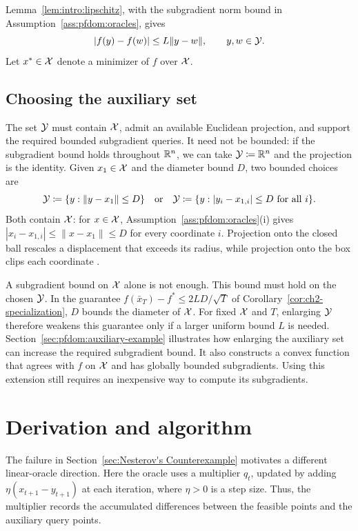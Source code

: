 Lemma~\ref{lem:intro:lipschitz}, with the subgradient norm bound
in Assumption~\ref{ass:pfdom:oracles}, gives
\begin{equation}\label{eq:pfdom:lipschitz}
    |f(y)-f(w)|\leq L\|y-w\|,\qquad y,w\in\mathcal{Y}.
\end{equation}
Let $x^*\in\mathcal{X}$ denote a minimizer of $f$ over $\mathcal{X}$.

\subsection{Choosing the auxiliary set}
\label{sec:pfdom:auxiliary-choice}

The set $\mathcal{Y}$ must contain $\mathcal{X}$, admit an available Euclidean projection,
and support the required bounded subgradient queries. It need not be bounded:
if the subgradient bound holds throughout $\mathbb{R}^n$, we can take $\mathcal{Y}\coloneqq\mathbb{R}^n$ and the
projection is the identity.
Given $x_1\in\mathcal{X}$ and the diameter bound $D$, two bounded choices are
\begin{equation}\label{eq:pfdom:enclosing-sets}
 \mathcal{Y}\coloneqq\{y:\|y-x_1\|\leq D\}
 \quad\text{or}\quad
 \mathcal{Y}\coloneqq\{y:|y_i-x_{1,i}|\leq D\ \text{for all }i\}.
\end{equation}
Both contain $\mathcal{X}$: for $x\in\mathcal{X}$, Assumption~\ref{ass:pfdom:oracles}(i)
gives $|x_i-x_{1,i}|\leq\|x-x_1\|\leq D$ for every coordinate $i$.
Projection onto the closed ball rescales a displacement
that exceeds its radius, while projection onto the box clips each coordinate
\cite[Section~3.2]{COMBETTES2021565}.

A subgradient bound on $\mathcal{X}$ alone is not enough. This bound must hold on the
chosen $\mathcal{Y}$. In the guarantee $f(\bar x_T)-f^*\leq2LD/\sqrt T$ of
Corollary~\ref{cor:ch2-specialization}, $D$ bounds the diameter of $\mathcal{X}$.
For fixed $\mathcal{X}$ and $T$, enlarging $\mathcal{Y}$ therefore weakens this guarantee
only if a larger uniform bound $L$ is needed.
Section~\ref{sec:pfdom:auxiliary-example} illustrates how enlarging the
auxiliary set can increase the required subgradient bound. It also
constructs a convex function that agrees with $f$ on $\mathcal{X}$ and has globally
bounded subgradients. Using this extension still requires an inexpensive
way to compute its subgradients.

\section{Derivation and algorithm}
\label{sec:pfdom:convex}
\label{sec:pfdom:separation}

The failure in Section~\ref{sec:Nesterov's Counterexample} motivates a
different linear-oracle direction. Here the oracle uses a multiplier
$q_t$, updated by adding $\eta(x_{t+1}-y_{t+1})$ at each iteration, where
$\eta>0$ is a step size. Thus, the multiplier records the accumulated
differences between the feasible points and the auxiliary query points.

